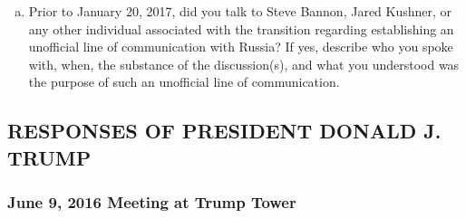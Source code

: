 \begin{enumerate}[a.]
\begin{enumerate}[i.]
\end{enumerate}

\item Prior to January 20, 2017, did you talk to Steve Bannon, Jared Kushner, or any other individual associated with the transition regarding establishing an unofficial line of communication with Russia?
If yes, describe who you spoke with, when, the substance of the discussion(s), and what you understood was the purpose of such an unofficial line of communication.

\end{enumerate}

\subsection{RESPONSES OF PRESIDENT DONALD J. TRUMP}

\subsubsection{June 9, 2016 Meeting at Trump Tower}

